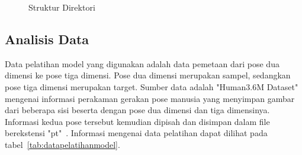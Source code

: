 \begin{figure}[htbp]
    \begin{center}
    \end{center}
    \vspace{-20pt}
    \captionsetup{labelfont=bf, textfont=bf}
    \caption{Struktur Direktori}
    \vspace{-10pt}
    \captionsetup{labelfont=md, textfont=md}
    \label{fig:strukturdirektori}
\end{figure}


\subsection{Analisis Data}

Data pelatihan model yang digunakan adalah data pemetaan dari pose dua dimensi ke pose tiga dimensi.
Pose dua dimensi merupakan sampel, sedangkan pose tiga dimensi merupakan target. Sumber data adalah
"Human3.6M Dataset" mengenai informasi perakaman gerakan pose manusia yang menyimpan gambar dari
beberapa sisi beserta dengan pose dua dimensi dan tiga dimensinya. Informasi kedua pose tersebut
kemudian dipisah dan disimpan dalam file berekstensi "pt"~\cite{h36m_pami}. Informasi mengenai data
pelatihan dapat dilihat pada tabel~\ref{tab:datapelatihanmodel}.

